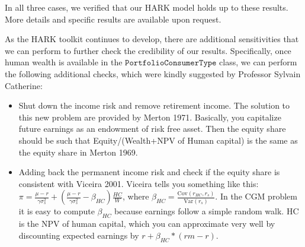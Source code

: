 \documentclass[./CGMPortfolio.tex]{subfiles}
\begin{document}
In all three cases, we verified that our HARK model holds up to these results. More details and specific results are available upon request. 

As the HARK toolkit continues to develop, there are additional sensitivities that we can perform to further check the credibility of our results. Specifically, once human wealth is available in the $\texttt{PortfolioConsumerType}$ class, we can perform the following additional checks, which were kindly suggested by Professor Sylvain Catherine:
\begin{itemize}
	\item Shut down the income risk and remove retirement income. The solution to this new problem are provided by Merton 1971. Basically, you capitalize future earnings as an endowment of risk free asset. Then the equity share should be such that Equity/(Wealth+NPV of Human capital) is the same as the equity share in Merton 1969.
	\item Adding back the permanent income risk and check if the equity share is consistent with Viceira 2001. Viceira tells you something like this: $\pi = \frac{\mu - r}{\gamma \sigma^2_s} + \left(\frac{\mu - r}{\gamma \sigma^2_s} - \beta_{HC} \right) \frac{HC}{W}$, where $\beta_{HC} = \frac{\text{Cov}(r_{HC},r_s)}{\text{Var}(r_s)}$. In the CGM problem it is easy to compute $\beta_{HC}$ because earnings follow a simple random walk. HC is the NPV of human capital, which you can approximate very well by discounting expected earnings by $r+\beta_{HC}*(rm-r)$.
\end{itemize}

\clearpage\vfill\eject

\onlyinsubfile{}
\end{document}

